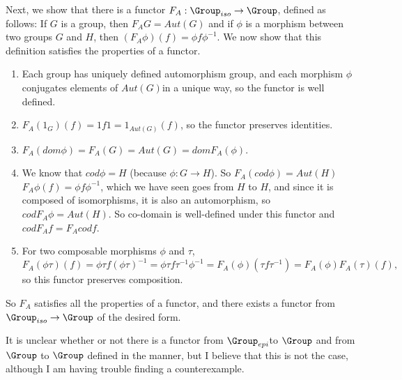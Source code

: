 \documentclass[main.tex]{subfiles}
\begin{document}
Next, we show that there is a functor $F_A: \Group_{iso} \rightarrow \Group$,
defined as follows: If $G$ is a group, then $F_AG = Aut(G)$ and if $\phi$ is a
morphism between two groups $G$ and $H$, then $(F_A\phi)(f) = \phi f \phi^{-1}$.
We now show that this definition satisfies the properties of a functor.
\begin{enumerate}
	\item Each group has uniquely defined automorphism group, and each morphism
		$\phi$ conjugates elements of $Aut(G)$in a unique way, so the functor is
		well defined.

	\item $F_A(1_G)(f) = 1f1 = 1_{Aut(G)}(f)$, so the functor preserves
		identities.

	\item $F_A(dom \phi) = F_A(G) = Aut(G) = dom F_A(\phi)$.

	\item We know that $cod\phi = H$ (because $\phi: G \rightarrow H$). So
		$F_A(cod\phi) = Aut(H)$ $F_A\phi(f) = \phi f \phi^{-1}$, which we have
		seen goes from $H$ to $H$, and since it is composed of isomorphisms, it
		is also an automorphism, so $codF_A\phi = Aut(H)$. So co-domain is
		well-defined under this functor and $codF_Af = F_Acodf$.

	\item For two composable morphisms $\phi$ and $\tau$, \[F_A(\phi\tau)(f) =
			\phi\tau f (\phi\tau)^{-1} = \phi \tau f \tau^{-1} \phi^{-1} =
		F_A(\phi)(\tau f \tau^{-1}) = F_A(\phi)F_A(\tau)(f),\] so this functor
		preserves composition.
\end{enumerate}
So $F_A$ satisfies all the properties of a functor, and there exists a functor
from $\Group_{iso} \rightarrow \Group$ of the desired form.

It is unclear whether or not there is a functor from  $\Group_{epi}$to $\Group$
and from $\Group$ to $\Group$ defined in the manner, but I believe that this is
not the case, although I am having trouble finding a counterexample.
\end{document}
